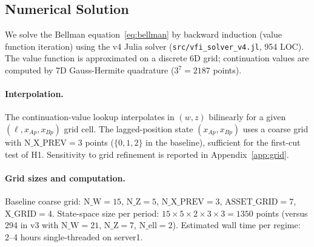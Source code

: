 \subsection{Numerical Solution}
\label{sec:model:numerical}

We solve the Bellman equation~\eqref{eq:bellman} by backward induction
(value function iteration) using the v4 Julia solver
(\texttt{src/vfi\_solver\_v4.jl}, 954 LOC).
The value function is approximated on a discrete 6D grid; continuation
values are computed by 7D Gauss-Hermite quadrature ($3^7 = 2187$ points).

\paragraph{Interpolation.}
The continuation-value lookup interpolates in $(w, z)$ bilinearly for
a given $(\ell, x_{Ap}, x_{Bp})$ grid cell.  The lagged-position state
$(x_{Ap}, x_{Bp})$ uses a coarse grid with $\text{N\_X\_PREV} = 3$
points ($\{0, 1, 2\}$ in the baseline), sufficient for the first-cut
test of H1.  Sensitivity to grid refinement is reported in
Appendix~\ref{app:grid}.

\paragraph{Grid sizes and computation.}
Baseline coarse grid: $\text{N\_W}=15$, $\text{N\_Z}=5$,
$\text{N\_X\_PREV}=3$, $\text{ASSET\_GRID}=7$, $\text{X\_GRID}=4$.
State-space size per period: $15 \times 5 \times 2 \times 3 \times 3 = 1350$
points (versus 294 in v3 with $\text{N\_W}=21$, $\text{N\_Z}=7$,
$\text{N\_ell}=2$).
Estimated wall time per regime: 2--4 hours single-threaded on server1.
